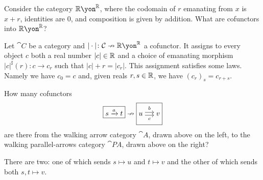 \documentclass[Book-Poly]{subfiles}
\begin{document}
\begin{example}\label{ex.cof_to_rr} %
Consider the category $\rr\yon^\rr$, where the codomain of $r$ emanating from $x$ is $x+r$, identities are $0$, and composition is given by addition. What are cofunctors into $\rr\yon^\rr$?

Let $\cat{C}$ be a category and $|\cdot|\colon\cat{C}\cof\rr\yon^\rr$ a cofunctor. It assigns to every object $c$ both a real number $|c|\in\mathbb{R}$ and a choice of emanating morphism $|c|^\sharp(r)\colon c\to c_r$ such that $|c|+r=|c_r|$. This assignment satisfies some laws. Namely we have $c_0=c$ and, given reals $r,s\in\mathbb{R}$, we have $(c_r)_s=c_{r+s}$. 
\end{example}


\begin{exercise} 
How many cofunctors
\[
    \fbox{$s\To{a}t$}\cof\fbox{$u\Tto{b}{c}v$}
\]
are there from the walking arrow category $\cat{A}$, drawn above on the left, to the walking parallel-arrows category $\cat{P\!A}$, drawn above on the right?
\begin{solution}
There are two: one of which sends $s\mapsto u$ and $t\mapsto v$ and the other of which sends both $s,t\mapsto v$.
\end{solution}
\end{exercise}
\end{document}

